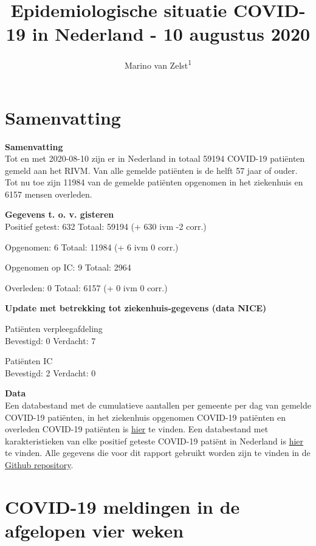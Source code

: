 \documentclass[
  english,
  man,floatsintext]{apa6}
\title{Epidemiologische situatie COVID-19 in Nederland - 10 augustus 2020}
\author{Marino van Zelst\textsuperscript{1}}
\date{}
\affiliation{\vspace{0.5cm}\textsuperscript{1} -}
\begin{document}
\maketitle

{
\hypersetup{linkcolor=}
\setcounter{tocdepth}{3}
\tableofcontents
}
\newpage

\hypertarget{samenvatting}{%
\section{Samenvatting}\label{samenvatting}}

\textbf{Samenvatting}\\
Tot en met 2020-08-10 zijn er in Nederland in totaal 59194 COVID-19 patiënten gemeld aan het RIVM. Van alle gemelde patiënten is de helft 57 jaar of ouder. Tot nu toe zijn 11984 van de gemelde patiënten opgenomen in het ziekenhuis en 6157 mensen overleden.

\textbf{Gegevens t. o. v. gisteren}\\
Positief getest: 632
Totaal: 59194 (+ 630 ivm -2 corr.)

Opgenomen: 6
Totaal: 11984 (+
6 ivm 0 corr.)

Opgenomen op IC: 9
Totaal: 2964

Overleden: 0
Totaal: 6157 (+
0 ivm 0 corr.)

\textbf{Update met betrekking tot ziekenhuis-gegevens (data NICE)}

Patiënten verpleegafdeling\\
Bevestigd: 0 Verdacht: 7

Patiënten IC\\
Bevestigd: 2 Verdacht: 0

\textbf{Data}\\
Een databestand met de cumulatieve aantallen per gemeente per dag van gemelde COVID-19 patiënten, in het ziekenhuis opgenomen COVID-19 patiënten en overleden COVID-19 patiënten is \href{https://data.rivm.nl/geonetwork/srv/dut/catalog.search\#/metadata/1c0fcd57-1102-4620-9cfa-441e93ea5604}{hier} te vinden. Een databestand met karakteristieken van elke positief geteste COVID-19 patiënt in Nederland is \href{https://data.rivm.nl/geonetwork/srv/dut/catalog.search\#/metadata/2c4357c8-76e4-4662-9574-1deb8a73f724?tab=relations}{hier} te vinden. Alle gegevens die voor dit rapport gebruikt worden zijn te vinden in de \href{https://github.com/mzelst/covid-19}{Github repository}.

\newpage

\hypertarget{covid-19-meldingen-in-de-afgelopen-vier-weken}{%
\section{COVID-19 meldingen in de afgelopen vier weken}\label{covid-19-meldingen-in-de-afgelopen-vier-weken}}
\end{document}
